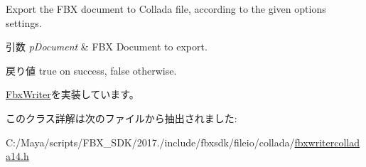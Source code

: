 Export the F\+BX document to Collada file, according to the given options settings. 
\begin{DoxyParams}{引数}
{\em p\+Document} & F\+BX Document to export. \\
\hline
\end{DoxyParams}
\begin{DoxyReturn}{戻り値}
true on success, false otherwise. 
\end{DoxyReturn}


\hyperlink{class_fbx_writer_aa8c0277611da0fdb0b9a184c55c30c2c}{Fbx\+Writer}を実装しています。



このクラス詳解は次のファイルから抽出されました\+:\begin{DoxyCompactItemize}
\item 
C\+:/\+Maya/scripts/\+F\+B\+X\+\_\+\+S\+D\+K/2017./include/fbxsdk/fileio/collada/\hyperlink{fbxwritercollada14_8h}{fbxwritercollada14.\+h}\end{DoxyCompactItemize}
